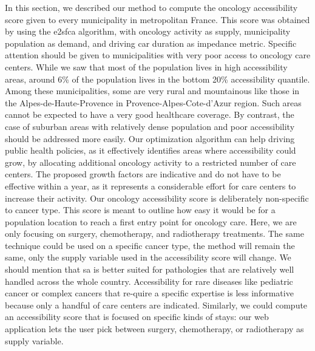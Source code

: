 In this section, we described our method to compute the oncology accessibility
score given to every municipality in metropolitan France. This score was
obtained by using the \acf{e2sfca} algorithm, with oncology activity as supply,
municipality population as demand, and driving car duration as impedance metric.
Specific attention should be given to municipalities with very poor access to
oncology care centers. While we saw that most of the population lives in high
accessibility areas, around 6\% of the population lives in the bottom 20\%
accessibility quantile. Among these municipalities, some are very rural and
mountainous like those in the Alpes-de-Haute-Provence in
Provence-Alpes-Cote-d'Azur region. Such areas cannot be expected to have a very
good healthcare coverage. By contrast, the case of suburban areas with
relatively dense population and poor accessibility should be addressed more
easily. Our optimization algorithm can help driving public health policies, as
it effectively identifies areas where accessibility could grow, by allocating
additional oncology activity to a restricted number of care centers. The
proposed growth factors are indicative and do not have to be effective within a
year, as it represents a considerable effort for care centers to increase their
activity. Our oncology accessibility score is deliberately non-specific to
cancer type. This score is meant to outline how easy it would be for a
population location to reach a first entry point for oncology care. Here, we are
only focusing on surgery, chemotherapy, and radiotherapy treatments. The same
technique could be used on a specific cancer type, the method will remain the
same, only the supply variable used in the accessibility score will change. We
should mention that \ac{sa} is better suited for pathologies that are relatively
well handled across the whole country. Accessibility for rare diseases like
pediatric cancer or complex cancers that re-quire a specific expertise is less
informative because only a handful of care centers are indicated. Similarly, we
could compute an accessibility score that is focused on specific kinds of stays:
our web application lets the user pick between surgery, chemotherapy, or
radiotherapy as supply variable.
